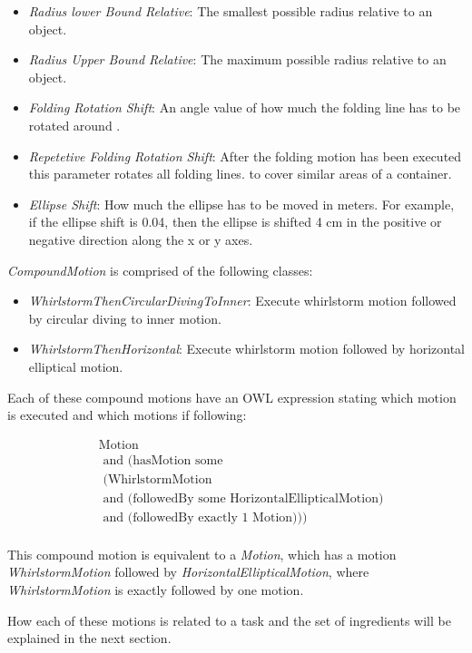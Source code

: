 \begin{itemize}
    \item \textit{Radius lower Bound Relative}: The smallest possible radius relative to an object.
    \item \textit{Radius Upper Bound Relative}: The maximum possible radius relative to an object.
    \item \textit{Folding Rotation Shift}: An angle value of how much the folding line has to be rotated around .
    \item \textit{Repetetive Folding Rotation Shift}: After the folding motion has been executed this parameter rotates all folding lines.
     to cover similar areas of a container. 
    \item \textit{Ellipse Shift}: How much the ellipse has to be moved in meters. For example, if the ellipse shift is 0.04, then the ellipse
     is shifted 4 cm in the positive or negative direction along the x or y axes.
\end{itemize}

\textit{CompoundMotion} is comprised of the following classes:
\begin{itemize}
    \item \textit{WhirlstormThenCircularDivingToInner}: Execute whirlstorm motion followed by circular diving to inner motion.
    \item \textit{WhirlstormThenHorizontal}: Execute whirlstorm motion followed by horizontal elliptical motion.
\end{itemize}

Each of these compound motions have an OWL expression stating which motion is executed and which motions if following:

\[
	\begin{aligned}
	&\text{Motion}\\
    &\text{ and (hasMotion some}\\
    &\text{      (WhirlstormMotion}\\
    &\text{       and (followedBy some HorizontalEllipticalMotion)}\\
	&\text{     and (followedBy exactly 1 Motion)))}\\
	\end{aligned}
\]

This compound motion is equivalent to a \textit{Motion}, which has a motion \textit{WhirlstormMotion} followed by 
\textit{HorizontalEllipticalMotion}, where \textit{WhirlstormMotion} is exactly followed by one motion. 

How each of these motions is related to a task and the set of ingredients will be explained in the next section.


